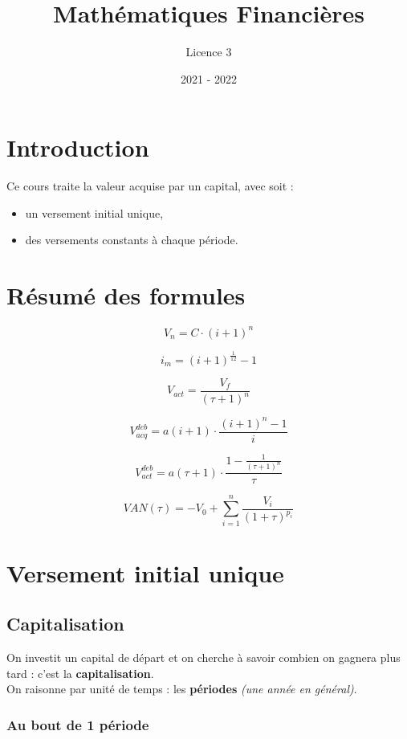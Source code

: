 \documentclass{article}
\title{Mathématiques Financières}
\author{Licence 3}
\date{2021 - 2022}
\begin{document}
\normalsize
\maketitle

\renewcommand*\contentsname{Table des matières}
\tableofcontents
\newpage

\section{Introduction}
Ce cours traite la valeur acquise par un capital, avec soit :


\begin{itemize}
   \item un versement initial unique,
   \item des versements constants à chaque période.
\end{itemize}

\section{Résumé des formules}

{
\large
$$ V_n = C\cdot(i+1)^n$$

$$i_m = (i+1)^{\frac{1}{12}} - 1$$

$$V_{act} = \dfrac{V_f}{(\tau+1)^n}$$

$$V^{deb}_{acq} = a(i+1)\cdot\dfrac{(i+1)^n-1}{i}$$

$$V^{deb}_{act} = a(\tau+1)\cdot\dfrac{1-\frac{1}{(\tau+1)^n}}{\tau}$$

$$VAN(\tau) = -V_0 + \sum_{i=1}^n \dfrac{V_i}{(1+\tau)^{p_i}}$$
}




\newpage
\section{Versement initial unique}

\subsection{Capitalisation}
On investit un capital de départ et on cherche à savoir combien on gagnera plus tard : c'est la \textbf{capitalisation}. 
\\ On raisonne par unité de temps : les  \textbf{périodes} \textit{(une année en général)}.

\subsubsection{Au bout de 1 période}
\end{document}
